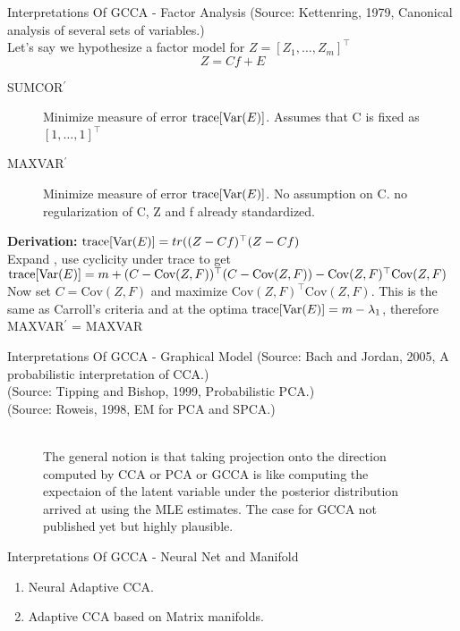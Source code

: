 \documentclass[compress]{beamer}
\newcommand{\fcite}[1]{{\tiny(Source: #1)}\\}
\newcommand{\Cov}{\textrm{Cov}}
\begin{document}
\begin{frame}{Interpretations Of GCCA - Factor Analysis}
  \fcite{Kettenring, 1979, Canonical analysis of several sets of variables.}
  Let's say we hypothesize a factor model for $Z = [Z_1, \ldots, Z_m ]^\top$
  $$Z = C f + E$$
  \begin{description}
  \item[SUMCOR$^\prime$] Minimize measure of error $\textrm{trace}[\textrm{Var}(E)]$. Assumes that C is fixed as $[1, \ldots, 1]^\top$
  \item[MAXVAR$^\prime$] Minimize measure of error $\textrm{trace}[\textrm{Var}(E)]$. No assumption on C. no regularization of
    C, Z and f already standardized.
  \end{description}
\textbf{Derivation:} $\textrm{trace}[\textrm{Var}(E)] = tr((Z - C f)^\top(Z - C f)$ \\Expand
, use cyclicity under trace to get $\tr[\var(E)] = m + (C -
  \Cov(Z, F))^\top(C -  \Cov(Z, F)) - \Cov(Z, F)^\top\Cov(Z, F)$
Now set $C = \Cov(Z, F)$ and maximize $\Cov(Z, F)^\top\Cov(Z,
F)$. This is the same as Carroll's criteria and at the optima
$\textrm{trace}[\textrm{Var}(E)] = m - \lambda_1$, therefore MAXVAR$^\prime$ = MAXVAR
\end{frame}

\begin{frame}{Interpretations Of GCCA - Graphical Model}
\fcite{Bach and
  Jordan, 2005, A probabilistic interpretation of CCA.}
\fcite{Tipping and Bishop, 1999, Probabilistic PCA.}
\fcite{Roweis, 1998, EM for PCA and SPCA.}
\begin{figure}[htbp]
  \\
  {\footnotesize The general notion is that taking projection onto the direction
  computed by CCA or PCA or GCCA is like computing the expectaion of
  the latent variable under the posterior distribution arrived at
  using the MLE estimates. The case for GCCA not published yet but
  highly plausible.}
\end{figure}
\end{frame}

\begin{frame}{Interpretations Of GCCA - Neural Net and Manifold}
\begin{enumerate}
\item Neural Adaptive CCA.
\item Adaptive CCA based on Matrix manifolds.
\end{enumerate}
\end{frame}
\end{document}
